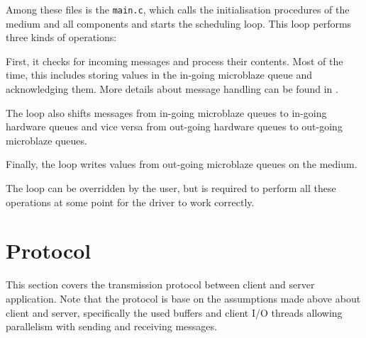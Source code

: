 \documentclass{report}
\begin{document}
Among these files is the \texttt{main.c}, which calls the initialisation procedures of the medium and all components and starts the scheduling loop. This loop performs three kinds of operations:

First, it checks for incoming messages and process their contents. Most of the time, this includes storing values in the in-going microblaze queue and acknowledging them. More details about message handling can be found in .

The loop also shifts messages from in-going microblaze queues to in-going hardware queues and vice versa from out-going hardware queues to out-going microblaze queues. 

Finally, the loop writes values from out-going microblaze queues on the medium.

The loop can be overridden by the user, but is required to perform all these operations at some point for the driver to work correctly.

\newpage
\section{Protocol}
\label{sec:protocol}
This section covers the transmission protocol between client and server application. Note that the protocol is base on the assumptions made above about client and server, specifically the used buffers and client I/O threads allowing parallelism with sending and receiving messages.
\end{document}
